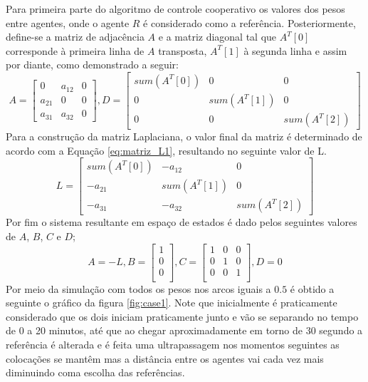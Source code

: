 Para  primeira parte do algoritmo de controle cooperativo os valores dos pesos entre agentes, onde o agente \( R \) é considerado como a referência. Posteriormente, define-se a matriz de adjacência \( A \) e a matriz diagonal tal que \( A^T[0] \) corresponde à primeira linha de \( A \) transposta, \( A^T[1] \) à segunda linha e assim por diante, como demonstrado a seguir:
\[
A = \begin{bmatrix}
0 & a_{12} & 0 \\
a_{21} & 0 & 0 \\
a_{31} & a_{32} & 0
\end{bmatrix} ,
D = \begin{bmatrix}
sum(A^{T}[0]) & 0 & 0 \\
0 & sum(A^{T}[1]) & 0 \\
0 & 0 & sum(A^{T}[2])
\end{bmatrix}
\]
Para a construção da matriz Laplaciana, o valor final da matriz é determinado de acordo com a Equação \ref{eq:matriz_L1}, resultando no seguinte valor de L.
\[
L = \begin{bmatrix}
    sum(A^{T}[0]) & -a_{12} & 0 \\
    -a_{21} & sum(A^{T}[1]) & 0 \\
    -a_{31} & -a_{32} & sum(A^{T}[2])
    \end{bmatrix}
\]
Por fim o sistema resultante em espaço de estados é dado pelos seguintes valores de $A$, $B$, $C$ e $D$;
\[
A = -L 
 , 
 B = \begin{bmatrix}
    1\\
    0\\
    0\\
\end{bmatrix}
 ,
C = \begin{bmatrix}
    1 & 0 & 0\\
    0 & 1 & 0\\
    0 & 0 & 1\\
\end{bmatrix}
 ,
D = 0
\]
Por meio da simulação com todos os pesos nos arcos iguais a $0.5$ é obtido a seguinte o gráfico da figura \ref{fig:case1}. Note que inicialmente é praticamente  considerado que os dois iniciam praticamente junto e vão se separando no tempo de 0 a 20 minutos, até que ao chegar aproximadamente em torno de 30 segundo a referência é alterada e é feita uma ultrapassagem nos momentos seguintes as colocações se mantêm mas a distância entre os agentes vai cada vez mais diminuindo coma escolha das referências. 

